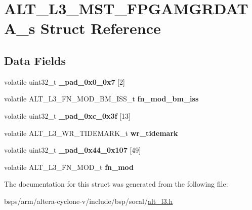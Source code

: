\hypertarget{structALT__L3__MST__FPGAMGRDATA__s}{}\section{A\+L\+T\+\_\+\+L3\+\_\+\+M\+S\+T\+\_\+\+F\+P\+G\+A\+M\+G\+R\+D\+A\+T\+A\+\_\+s Struct Reference}
\label{structALT__L3__MST__FPGAMGRDATA__s}
\subsection*{Data Fields}
\begin{DoxyCompactItemize}
\item 
\mbox{\label{structALT__L3__MST__FPGAMGRDATA__s_ae14093b5789ad294ed0324db1f23dea1}} 
volatile uint32\+\_\+t {\bfseries \+\_\+pad\+\_\+0x0\+\_\+0x7} \mbox{[}2\mbox{]}
\item 
\mbox{\label{structALT__L3__MST__FPGAMGRDATA__s_a7a1a69e6e9bd6d450b2bbba9bcdf4c42}} 
volatile A\+L\+T\+\_\+\+L3\+\_\+\+F\+N\+\_\+\+M\+O\+D\+\_\+\+B\+M\+\_\+\+I\+S\+S\+\_\+t {\bfseries fn\+\_\+mod\+\_\+bm\+\_\+iss}
\item 
\mbox{\label{structALT__L3__MST__FPGAMGRDATA__s_a0549b28e899f7ef6b3506aeb9e2c5678}} 
volatile uint32\+\_\+t {\bfseries \+\_\+pad\+\_\+0xc\+\_\+0x3f} \mbox{[}13\mbox{]}
\item 
\mbox{\label{structALT__L3__MST__FPGAMGRDATA__s_a3d3ff3710012c926bd05d3711d0c8af7}} 
volatile A\+L\+T\+\_\+\+L3\+\_\+\+W\+R\+\_\+\+T\+I\+D\+E\+M\+A\+R\+K\+\_\+t {\bfseries wr\+\_\+tidemark}
\item 
\mbox{\label{structALT__L3__MST__FPGAMGRDATA__s_a1bbfbf90800bb942f46a0e94cd5116cb}} 
volatile uint32\+\_\+t {\bfseries \+\_\+pad\+\_\+0x44\+\_\+0x107} \mbox{[}49\mbox{]}
\item 
\mbox{\label{structALT__L3__MST__FPGAMGRDATA__s_acdeb24474baa0e8243733c4930ff112c}} 
volatile A\+L\+T\+\_\+\+L3\+\_\+\+F\+N\+\_\+\+M\+O\+D\+\_\+t {\bfseries fn\+\_\+mod}
\end{DoxyCompactItemize}


The documentation for this struct was generated from the following file\+:\begin{DoxyCompactItemize}
\item 
bsps/arm/altera-\/cyclone-\/v/include/bsp/socal/\mbox{\hyperlink{alt__l3_8h}{alt\+\_\+l3.\+h}}\end{DoxyCompactItemize}
